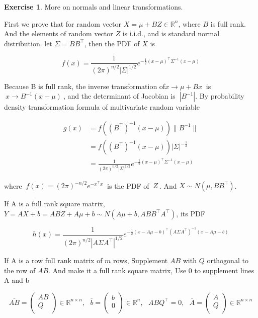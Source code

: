 \documentclass[11pt,a4paper]{report}
\theoremstyle{definition}\newtheorem{exercise}{Exercise}[chapter]
\begin{document}
\begin{exercise}More on normals and linear transformations.\\
\end{exercise}
\begin{answer}
    First we prove that for random vector $X = \mu + BZ \in \mathbb{R}^{n}$, where $B$ is full rank. And the elements of random vector $Z$ is i.i.d., and is standard normal distribution. let $\Sigma = BB^{\top}$, then the PDF of $X$ is

    \[f(x) = \frac{1}{(2\pi)^{n/2}|\Sigma|^{1/2}}e^{- \frac{1}{2}(x - \mu)^{\top}\Sigma^{- 1}(x - \mu)}\]
    
    Because B is full rank, the inverse transformation of\(x \rightarrow \mu + Bx\ \) is \(\ x \rightarrow B^{- 1}(x - \mu)\ \), and the determinant of Jacobian is \(\ \left| B^{- 1} \right|\). By probability density transformation formula of multivariate random variable
    
    \begin{align}
        g(x) &= f\left( \left( B^{\top} \right)^{- 1}(x - \mu) \right)\| B^{- 1} \|\\
        &= f\left( \left( B^{\top} \right)^{- 1}(x - \mu) \right)|\Sigma|^{- \frac{1}{2}}\\
        &= \frac{1}{(2\pi)^{n/2}|\Sigma|^{1/2}}e^{- \frac{1}{2}(x - \mu)^{\top}\Sigma^{- 1}(x - \mu)}
    \end{align}

    
    where \(\ f(x) = (2\pi)^{- n/2}e^{- x^{\top}x}\ \) is the PDF of \(\ Z\ \). And \(X \sim N(\mu,BB^{\top})\).
    
    If A is a full rank square matrix, \(Y = AX + b = ABZ + A\mu + b \sim N(A\mu + b,ABB^{\top}A^{\top})\), its PDF
    
    \[h(x) = \frac{1}{(2\pi)^{n/2}\left| A\Sigma A^{\top} \right|^{1/2}}e^{- \frac{1}{2}(x - A\mu - b)^{\top}{(A\Sigma A^{\top})}^{- 1}(x - A\mu - b)}\]
    
    If A is a row full rank matrix of $m$ rows, Supplement \( AB \) with \( Q \) orthogonal to the row of \( AB \). And make it a full rank square matrix, Use 0 to supplement lines A and b
    
    \[\overline{AB} = \begin{pmatrix}
    AB \\
    Q \\
    \end{pmatrix} \in \mathbb{R}^{n \times n},\ \ \ \overline{b} = \begin{pmatrix}
    b \\
    0 \\
    \end{pmatrix} \in \mathbb{R}^{n},\ \ \ ABQ^{\top} = 0,\ \ \ \overline{A} = \begin{pmatrix}
    A \\
    Q \\
    \end{pmatrix} \in \mathbb{R}^{n \times n}\]
    

\end{answer}
\end{document}
